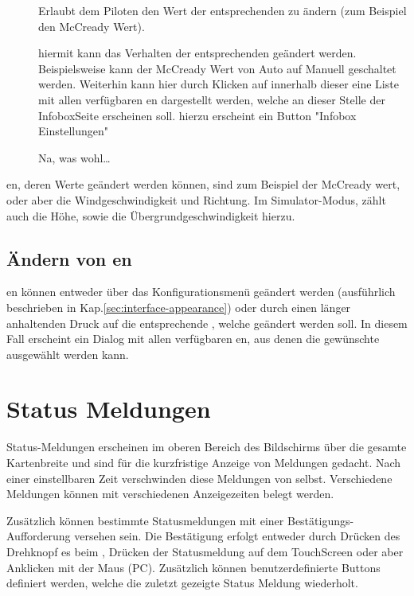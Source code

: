 \begin{description}
\item[]
Erlaubt dem Piloten den Wert der entsprechenden {\InfoBox} zu ändern (zum Beispiel den McCready Wert).

\item[]
hiermit kann das Verhalten der entsprechenden {\InfoBox} geändert werden. Beispielsweise kann der McCready Wert von Auto auf Manuell geschaltet werden.
Weiterhin kann hier durch Klicken auf   innerhalb dieser {\InfoBox}  eine Liste mit allen verfügbaren {\InfoBox}en dargestellt werden, welche an dieser Stelle der InfoboxSeite erscheinen soll. hierzu erscheint ein Button "Infobox Einstellungen"

\item[] Na, was wohl\dots
\end{description}

{\InfoBox}en, deren Werte geändert werden können, sind zum Beispiel der McCready wert, oder aber die Windgeschwindigkeit und Richtung. Im Simulator-Modus, zählt auch die Höhe, sowie die Übergrundgeschwindigkeit hierzu.

\subsection*{Ändern von {\InfoBox}en}
{\InfoBox}en können entweder über das Konfigurationsmenü geändert werden 
 (ausführlich beschrieben in Kap.\ref{sec:interface-appearance})
oder durch einen länger anhaltenden Druck auf die entsprechende  {\InfoBox}, welche geändert werden soll.
 In diesem Fall erscheint ein Dialog mit allen verfügbaren {\InfoBox}en, aus denen die gewünschte ausgewählt werden kann.
 

\section{Status Meldungen}
Status-Meldungen erscheinen im oberen Bereich des Bildschirms über die gesamte Kartenbreite und sind für die kurzfristige Anzeige von Meldungen gedacht. Nach einer einstellbaren Zeit verschwinden diese Meldungen von selbst. Verschiedene Meldungen können mit verschiedenen Anzeigezeiten belegt werden.

Zusätzlich können bestimmte Statusmeldungen mit einer Bestätigungs-Aufforderung versehen sein.
Die Bestätigung erfolgt entweder durch Drücken des Drehknopf es beim \al, Drücken der Statusmeldung auf dem TouchScreen oder aber Anklicken mit der Maus (\textsf{PC}).  Zusätzlich können benutzerdefinierte Buttons definiert werden, welche die zuletzt gezeigte Status Meldung wiederholt.

